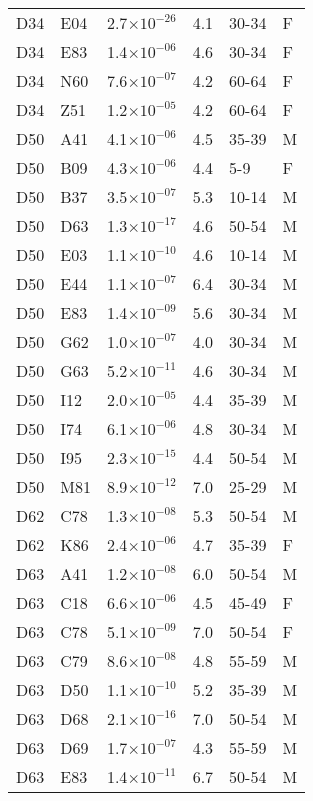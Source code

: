 \begin{longtable}{lllrll}
   D34 & E04 & 2.7$\times10^{-26}$ & 4.1 & 30-34 & F \\ 
   D34 & E83 & 1.4$\times10^{-06}$ & 4.6 & 30-34 & F \\ 
   D34 & N60 & 7.6$\times10^{-07}$ & 4.2 & 60-64 & F \\ 
   D34 & Z51 & 1.2$\times10^{-05}$ & 4.2 & 60-64 & F \\ 
   D50 & A41 & 4.1$\times10^{-06}$ & 4.5 & 35-39 & M \\ 
   D50 & B09 & 4.3$\times10^{-06}$ & 4.4 & 5-9 & F \\ 
   D50 & B37 & 3.5$\times10^{-07}$ & 5.3 & 10-14 & M \\ 
   D50 & D63 & 1.3$\times10^{-17}$ & 4.6 & 50-54 & M \\ 
   D50 & E03 & 1.1$\times10^{-10}$ & 4.6 & 10-14 & M \\ 
   D50 & E44 & 1.1$\times10^{-07}$ & 6.4 & 30-34 & M \\ 
   D50 & E83 & 1.4$\times10^{-09}$ & 5.6 & 30-34 & M \\ 
   D50 & G62 & 1.0$\times10^{-07}$ & 4.0 & 30-34 & M \\ 
   D50 & G63 & 5.2$\times10^{-11}$ & 4.6 & 30-34 & M \\ 
   D50 & I12 & 2.0$\times10^{-05}$ & 4.4 & 35-39 & M \\ 
   D50 & I74 & 6.1$\times10^{-06}$ & 4.8 & 30-34 & M \\ 
   D50 & I95 & 2.3$\times10^{-15}$ & 4.4 & 50-54 & M \\ 
   D50 & M81 & 8.9$\times10^{-12}$ & 7.0 & 25-29 & M \\ 
   D62 & C78 & 1.3$\times10^{-08}$ & 5.3 & 50-54 & M \\ 
   D62 & K86 & 2.4$\times10^{-06}$ & 4.7 & 35-39 & F \\ 
   D63 & A41 & 1.2$\times10^{-08}$ & 6.0 & 50-54 & M \\ 
   D63 & C18 & 6.6$\times10^{-06}$ & 4.5 & 45-49 & F \\ 
   D63 & C78 & 5.1$\times10^{-09}$ & 7.0 & 50-54 & F \\ 
   D63 & C79 & 8.6$\times10^{-08}$ & 4.8 & 55-59 & M \\ 
   D63 & D50 & 1.1$\times10^{-10}$ & 5.2 & 35-39 & M \\ 
   D63 & D68 & 2.1$\times10^{-16}$ & 7.0 & 50-54 & M \\ 
   D63 & D69 & 1.7$\times10^{-07}$ & 4.3 & 55-59 & M \\ 
   D63 & E83 & 1.4$\times10^{-11}$ & 6.7 & 50-54 & M \\ 

\end{longtable}
